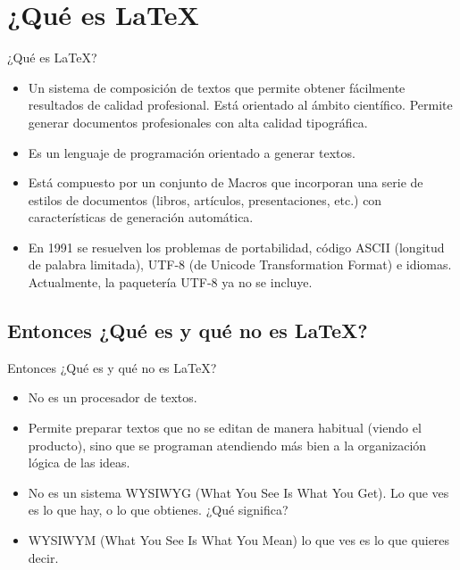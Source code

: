 \documentclass[aspectratio=169, 10pt]{beamer}
\begin{document}
\section{¿Qué es \LaTeX}

\begin{frame}{¿Qué es \LaTeX ?}
    \begin{itemize}
    \justifying
        \item Un sistema de composición de textos que permite obtener fácilmente resultados de calidad profesional. Está orientado al ámbito científico. Permite generar documentos profesionales con alta calidad tipográfica.
        \item Es un lenguaje de programación orientado a generar textos. 
        \item Está compuesto por un conjunto de Macros  que incorporan una serie de estilos de documentos (libros, artículos, presentaciones, etc.) con características de generación automática.%
        \item En 1991 se resuelven los problemas de portabilidad, código ASCII (longitud de palabra limitada), UTF-8 (de Unicode Transformation Format) e idiomas. Actualmente, la paquetería UTF-8 ya no se incluye.
    \end{itemize}

\end{frame}

\subsection{Entonces ¿Qué es y qué no es \LaTeX?}
\begin{frame}{Entonces ¿Qué es y qué no es \LaTeX?}
    \begin{itemize}
    \justifying
        \item No es un procesador de textos.
        \item Permite preparar textos que no se editan de manera habitual (viendo el producto), sino que se programan atendiendo más bien a la organización lógica de las ideas.
        \item No es un sistema WYSIWYG (What You See Is What You Get). Lo que ves es lo que hay, o lo que obtienes. ¿Qué significa? 
        \item WYSIWYM (What You See Is What You Mean) lo que ves es lo que quieres decir.
    \end{itemize}
\end{frame}
\end{document}

